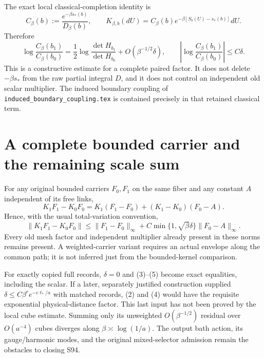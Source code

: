 \documentclass{article}
\begin{document}
The exact local classical-completion identity is
\[
 C_\beta(b):=\frac{e^{-\beta s_*(b)}}{D_\beta(b)},\qquad
 K_{\beta,b}(dU)=C_\beta(b)e^{-\beta[S_b(U)-s_*(b)]}dU.
\]
Therefore
\[
 \log\frac{C_\beta(b_1)}{C_\beta(b_0)}
 =\frac12\log\frac{\det H_{b_1}}{\det H_{b_0}}
 +O(\beta^{-1/2}\delta),\qquad
 \left|\log\frac{C_\beta(b_1)}{C_\beta(b_0)}\right|\leq C\delta.
 \tag{4}
\]
This is a constructive estimate for a complete paired factor. It does not delete $-\beta s_*$ from the raw partial integral $D$, and it does not control an independent old scalar multiplier. The induced boundary coupling of \texttt{induced\_boundary\_coupling.tex} is contained precisely in that retained classical term.

\section{A complete bounded carrier and the remaining scale sum}
For any original bounded carriers $F_0,F_1$ on the same fiber and any constant $A$ independent of its free links,
\[
 K_1F_1-K_0F_0=K_1(F_1-F_0)+(K_1-K_0)(F_0-A).
\]
Hence, with the usual total-variation convention,
\[
 \|K_1F_1-K_0F_0\|
 \leq\|F_1-F_0\|_\infty+
 C\min\{1,\sqrt\beta\delta\}\|F_0-A\|_\infty.
 \tag{5}
\]
Every old mesh factor and independent multiplier already present in these norms remains present. A weighted-carrier variant requires an actual envelope along the common path; it is not inferred just from the bounded-kernel comparison.

For exactly copied full records, $\delta=0$ and (3)--(5) become exact equalities, including the scalar. If a later, separately justified construction supplied $\delta\leq C\beta^r e^{-c\ell_*/a}$ with matched records, (2) and (4) would have the requisite exponential physical-distance factor. This last input has not been proved by the local cube estimate. Summing only its unweighted $O(\beta^{-1/2})$ residual over $O(a^{-4})$ cubes diverges along $\beta\asymp\log(1/a)$. The output bath action, its gauge/harmonic modes, and the original mixed-selector admission remain the obstacles to closing S94.
\end{document}
